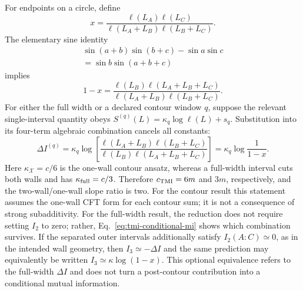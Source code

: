 \documentclass[aps,prb,twocolumn,floatfix,nofootinbib,superscriptaddress]{revtex4-2}
\begin{document}
For endpoints on a circle, define
\begin{equation}
 x=\frac{\ell(L_A)\ell(L_C)}
 {\ell(L_A+L_B)\ell(L_B+L_C)}.
 \label{eq:tmi-cross-ratio}
\end{equation}
The elementary sine identity
\begin{multline}
 \sin(a+b)\sin(b+c)-\sin a\sin c\\
 =\sin b\sin(a+b+c)
 \label{eq:tmi-sine-identity}
\end{multline}
implies
\begin{equation}
 1-x=\frac{\ell(L_B)\ell(L_A+L_B+L_C)}
 {\ell(L_A+L_B)\ell(L_B+L_C)}.
 \label{eq:tmi-one-minus-x}
\end{equation}
For either the full width or a declared contour window $q$, suppose the relevant
single-interval quantity obeys
$S^{(q)}(L)=\kappa_q\log\ell(L)+s_q$.  Substitution into its four-term algebraic
combination cancels all constants:
\begin{equation}
 \Delta I^{(q)}
 =\kappa_q\log\!\left[
 \frac{\ell(L_A+L_B)\ell(L_B+L_C)}
 {\ell(L_B)\ell(L_A+L_B+L_C)}\right]
 =\kappa_q\log\frac1{1-x}.
 \label{eq:tmi-cft-fit}
\end{equation}
Here $\kappa_{\mathcal X}=c/6$ is the one-wall contour ansatz, whereas a full-width
interval cuts both walls and has $\kappa_{\rm full}=c/3$.  Therefore
$c_{\rm TMI}=6m$ and $3m$, respectively, and the two-wall/one-wall slope ratio is two.
For the contour result this statement assumes the one-wall CFT form for each contour sum;
it is not a consequence of strong subadditivity.  For the full-width result, the reduction
does not require setting $I_2$ to zero; rather, Eq.~\eqref{eq:tmi-conditional-mi} shows
which combination survives.
If the separated outer intervals additionally satisfy $I_2(A:C)\simeq0$, as in the
intended wall geometry, then $I_3\simeq-\Delta I$ and the same prediction may equivalently
be written $I_3\simeq\kappa\log(1-x)$.
This optional equivalence refers to the full-width $\Delta I$ and does not turn a
post-contour contribution into a conditional mutual information.
\end{document}
